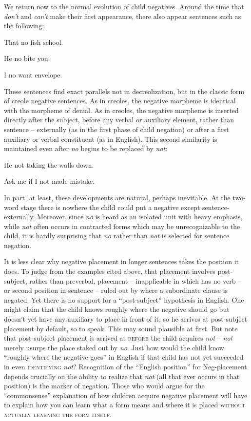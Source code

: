 We return now to the normal evolution of child negatives. Around the time that \textit{don't} and \textit{can't} make their first appearance, there also appear sentences such as the following:

\ea\label{ex:3:58}
 That no fish school. 
\z

\ea\label{ex:3:59}
 He no bite you. 
\z

\ea\label{ex:3:60}
 I no want envelope. 
\z

These sentences find exact parallels not in decreolization, but in the classic form of creole negative sentences. As in creoles, the negative morpheme is identical with the morpheme of denial. As in creoles, the negative morpheme is inserted directly after the subject, before any verbal or auxiliary element, rather than sentence -- externally (as in the first phase of child negation) or after a first auxiliary or verbal constituent (as in English). This second similarity is maintained even after \textit{no} begins to be replaced by \textit{not}:

\ea\label{ex:3:61}
 He not taking the walls down.
\z

\ea\label{ex:3:62}
 Ask me if I not made mistake.
\z

In part, at least, these developments are natural, perhaps inevitable. At the two-word stage there is nowhere the child could put a negative except sentence-externally. Moreover, since \textit{no} is heard as an isolated unit with heavy emphasis, while \textit{not} often occurs in contracted forms which may be unrecognizable to the child, it is hardly surprising that \textit{no} rather than \textit{not} is selected for sentence negation.

It is less clear why negative placement in longer sentences takes the position it does. To judge from the examples cited above, that placement involves post-subject, rather than preverbal, placement -- inapplicable in  which has no verb -- or second position in sentence -- ruled out by  where a subordinate clause is negated. Yet there is no support for a ``post-subject'' hypothesis in English. One might claim that the child knows roughly where the negative should go but doesn't yet have any auxiliary to place in front of it, so he arrives at post-subject placement by default, so to speak. This may sound plausible at first. But note that post-subject placement is arrived at \textsc{before} the child acquires \textit{not} -- \textit{not} merely usurps the place staked out by \textit{no}. Just how would the child know ``roughly where the negative goes'' in English if that child has not yet succeeded in even \textsc{identifying} \textit{not}? Recognition of the ``English position'' for Neg-placement depends crucially on the ability to realize that \textit{not} (all that ever occurs in that position) is the marker of negation. Those who would argue for the ``commonsense'' explanation of how children acquire negative placement will have to explain how you can learn what a form means and where it is placed \textsc{without actually learning the form itself}.

